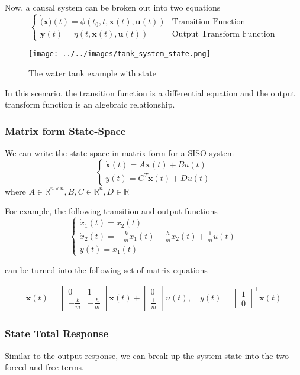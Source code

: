 \documentclass[11pt]{article}
\begin{document}
Now, a causal system can be broken out into two equations
\begin{equation}
\begin{cases}
  \dot(\textbf{x})(t) = \phi(t_0, t, \textbf{x}(t), \textbf{u}(t)) & \text{Transition Function} \\
  \textbf{y}(t) = \eta(t, \textbf{x}(t), \textbf{u}(t)) & \text{Output Transform Function}
\end{cases}
\end{equation}

\begin{figure}[htbp]
  \centerline{\texttt{[image: ../../images/tank\_system\_state.png]}}
  \caption{The water tank example with state}
  \label{fig:tank_system_state}
\end{figure}

In this scenario, the transition function is a differential equation and the output transform function is an algebraic relationship.

\subsubsection{Matrix form State-Space}

We can write the state-space in matrix form for a SISO system
\begin{equation}
  \begin{cases}
    \dot{\textbf{x}}(t) = A \textbf{x}(t) + B u(t) \\
    y(t) = C^T \textbf{x} (t) + D u(t)
  \end{cases}
\end{equation}
where $A \in \mathbb{R}^{n \times n}, B, C \in \mathbb{R}^n, D \in \mathbb{R}$

For example, the following transition and output functions
\begin{equation}
  \begin{cases}
    \dot{x}_1 (t) = x_2 (t) \\
    \dot{x}_2 (t) = -\frac{k}{m} x_1 (t) - \frac{h}{m} x_2 (t) + \frac{1}{m} u(t) \\
    y(t) = x_1 (t)
  \end{cases}
\end{equation}

can be turned into the following set of matrix equations


\begin{align}
  \dot{\textbf{x}} (t) = 
  \begin{bmatrix}
      0 & 1 \\ - \frac{k}{m} & - \frac{h}{m}
  \end{bmatrix}
  \textbf{x} (t)
  +
  \begin{bmatrix}
    0 \\ \frac{1}{m}
  \end{bmatrix}
  u(t)
  , \quad
  y(t) =
  \begin{bmatrix}
    1 \\ 0
  \end{bmatrix}^\top 
  \textbf{x}(t)
\end{align}

\subsubsection{State Total Response}
Similar to the output response, we can break up the system state into the two forced and free terms.
\end{document}
